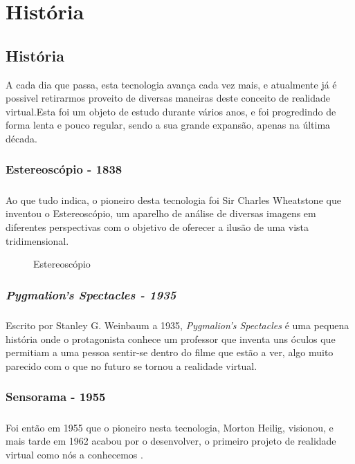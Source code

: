 \chapter{História}
\label{cap.historia}
\paragraph{}
\section{História}
	A cada dia que passa, esta tecnologia avança cada vez mais, e atualmente já é possivel retirarmos proveito de diversas maneiras deste conceito de realidade virtual.Esta foi um objeto de estudo durante vários anos, e foi progredindo de forma lenta e pouco regular, sendo a sua grande expansão, apenas na última década.
	\subsection{Estereoscópio - 1838}
		\paragraph{}
Ao que tudo indica, o pioneiro desta tecnologia foi Sir Charles Wheatstone que inventou o Estereoscópio, um aparelho de análise de diversas imagens em diferentes perspectivas com o objetivo de oferecer a ilusão de uma vista tridimensional.
			\begin{figure}
				\center
				\caption{Estereoscópio \cite{4}}
			\end{figure}
	\subsection{\textit{Pygmalion’s Spectacles - 1935}}
	\paragraph{}
Escrito por Stanley G. Weinbaum a 1935,  \textit{Pygmalion's Spectacles} é uma pequena história onde o protagonista conhece um professor que inventa uns óculos que permitiam a uma pessoa sentir-se dentro do filme que estão a ver, algo muito parecido com o que no futuro se tornou a realidade virtual.
	\subsection{Sensorama - 1955}
 \paragraph{}
 Foi então em 1955 que o pioneiro nesta tecnologia, Morton Heilig, visionou, e mais tarde em 1962 acabou por o desenvolver, o primeiro projeto de realidade virtual como nós a conhecemos .
 
